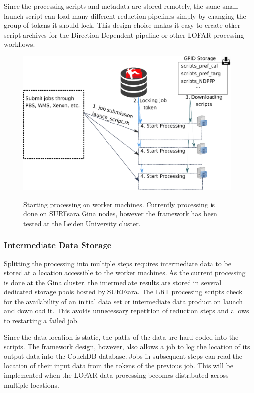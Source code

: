Since the processing scripts and metadata are stored remotely, the same small launch script can load many different reduction pipelines simply by changing the group of tokens it should lock.  This design choice makes it easy to create other script archives for the Direction Dependent pipeline or other LOFAR processing workflows. 

\begin{figure}
 \includegraphics[width=.7\textwidth]{ch3/figures/token_run.eps}\\
    \caption[Starting processing on worker machines]{Starting processing on worker machines. Currently processing is done on SURFsara Gina nodes, however the framework has been tested at the Leiden University cluster.}
 \label{fig:ch3_tok_run}
\end{figure}


\subsubsection{Intermediate Data Storage}\label{sec:ch3_intermediate_storage}

Splitting the processing into multiple steps requires intermediate data to be stored at a location accessible to the worker machines. As the current processing is done at the Gina cluster, the intermediate results are stored in several dedicated
storage pools hosted by SURFsara. The LRT processing scripts check for the availability of an initial data set or intermediate data product on launch and download it. This avoids unnecessary repetition of reduction steps and allows to restarting a failed job.

Since the data location is static, the paths of the data are hard coded into the scripts. The framework design, however, also allows a job to log the location of its output data into the CouchDB database. Jobs in subsequent steps can read the location of their input data from the tokens of the previous job. This will be implemented when the LOFAR data processing becomes distributed across multiple locations. 

